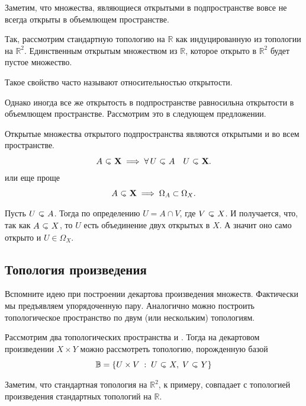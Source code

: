     \begin{Note}
        Заметим, что множества, являющиеся открытыми в подпространстве вовсе не всегда открыты в объемлющем пространстве.

        Так, рассмотрим стандартную топологию на $\mathbb{R}$ как индуцированную из топологии на $\mathbb{R}^2$. Единственным открытым множеством из $\mathbb{R}$, которое открыто в $\mathbb{R}^2$ будет пустое множество. 

        Такое свойство часто называют относительностью открытости.
    \end{Note}

 Однако иногда все же открытость в подпространстве равносильна открытости в объемлющем пространстве. Рассмотрим это в следующем предложении.

    \begin{Prop}
        Открытые множества открытого подпространства являются открытыми и во всем пространстве.
        \[
        A \open \X  \implies \forall U \open A \quad U \open \X.
        \] 
        или еще проще
        \[
        A \open \X \implies \Omega_A \subset \Omega_X.
        \] 
    \end{Prop}
    \begin{Proof}
        Пусть $U\open A$. Тогда по определению $U = A \cap V$, где $V \open X$. И получается, что, так как $A \open X$, то $U$ есть объединение двух открытых в $X$. А значит оно само открыто и $U \in \Omega_X$. 
    \end{Proof}

    \subsection{Топология произведения}
    Вспомните идею при построении декартова произведения множеств. Фактически мы предъявляем упорядоченную пару. Аналогично можно построить топологическое пространство по двум (или нескольким) топологиям. 
    \begin{Def}
        Рассмотрим два топологических пространства \topX и \topY. Тогда на декартовом произведении  $X \times Y$ можно рассмотреть топологию, порожденную базой
         \[
             \mathbb{B} = \{ U \times V \st U \open X, \; V \open Y\}
        \] 
    \end{Def}
    \begin{Ex}
        Заметим, что стандартная топология на $\mathbb{R}^2$, к примеру, совпадает с топологией произведения стандартных топологий на $\mathbb{R}$. 
    \end{Ex}

